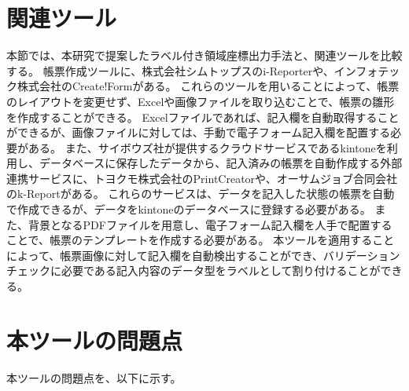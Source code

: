 




\section{関連ツール}\label{sec:relation_tools}
本節では、本研究で提案したラベル付き領域座標出力手法と、関連ツールを比較する。
帳票作成ツールに、株式会社シムトップスのi-Reporter\cite{i-Reporter}や、インフォテック株式会社のCreate!Form\cite{Create!Form}がある。
これらのツールを用いることによって、帳票のレイアウトを変更せず、Excelや画像ファイルを取り込むことで、帳票の雛形を作成することができる。
Excelファイルであれば、記入欄を自動取得することができるが、画像ファイルに対しては、手動で電子フォーム記入欄を配置する必要がある。
また、サイボウズ社が提供するクラウドサービスであるkintone\cite{kintone}を利用し、データベースに保存したデータから、記入済みの帳票を自動作成する外部連携サービスに、トヨクモ株式会社のPrintCreator\cite{PrintCreator}や、オーサムジョブ合同会社のk-Report\cite{k-Report}がある。
これらのサービスは、データを記入した状態の帳票を自動で作成できるが、データをkintoneのデータベースに登録する必要がある。
また、背景となるPDFファイルを用意し、電子フォーム記入欄を人手で配置することで、帳票のテンプレートを作成する必要がある。
本ツールを適用することによって、帳票画像に対して記入欄を自動検出することができ、バリデーションチェックに必要である記入内容のデータ型をラベルとして割り付けることができる。

\section{本ツールの問題点}\label{sec:problems}
本ツールの問題点を、以下に示す。

